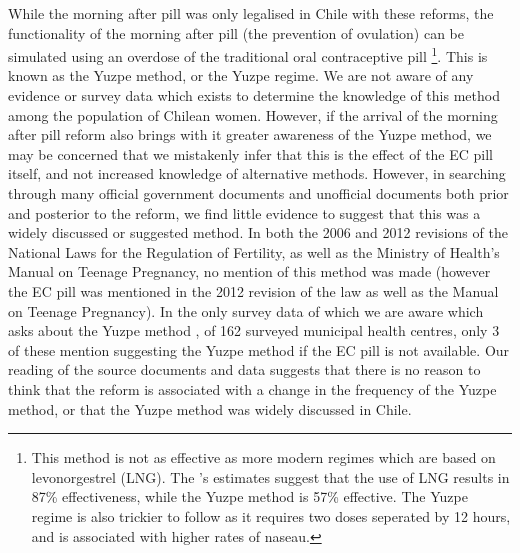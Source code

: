 \documentclass[11pt,subeqn]{article}
\begin{document}
\begin{spacing}{1.4}
While the morning after pill was only legalised in Chile with these reforms,
the functionality of the morning after pill (the prevention of ovulation) can
be simulated using an overdose of the traditional oral contraceptive pill 
\citep{TaskForce1998}\footnote{This method is not as effective as more 
modern regimes which are based on levonorgestrel (LNG). The 
\citeauthor{TaskForce1998}'s estimates suggest that the use of LNG results in
87\% effectiveness, while the Yuzpe method is 57\% effective. The Yuzpe regime
is also trickier to follow as it requires two doses seperated by 12 hours, and
is associated with higher rates of naseau.}. This is known as the Yuzpe method, 
or the Yuzpe regime. We are not aware of any evidence or survey data which exists 
to determine the knowledge of this method among the population of Chilean women.  
However, if the arrival of the morning after pill reform also brings with it 
greater awareness of the Yuzpe method, we may be concerned that we mistakenly 
infer that this is the effect of the EC pill itself, and not increased knowledge 
of alternative methods.  However, in searching through many official government 
documents and unofficial documents both prior and posterior to the reform, we 
find little evidence to suggest that this was a widely discussed or suggested 
method.  In both the 2006 and 2012 revisions of the National Laws for the 
Regulation of Fertility, as well as the Ministry of Health's Manual on Teenage 
Pregnancy, no mention of this method was made (however the EC pill was mentioned 
in the 2012 revision of the law as well as the Manual on Teenage Pregnancy). In 
the only survey data of which we are aware which asks about the Yuzpe method 
\citep{Didesetal2010}, of 162 surveyed municipal health centres, only 3 of 
these mention suggesting the Yuzpe method if the EC pill is not available.  Our 
reading of the source documents and data suggests that there is no reason to 
think that the reform is associated with a change in the frequency of the Yuzpe 
method, or that the Yuzpe method was widely discussed in Chile.


\end{spacing}
\end{document}
